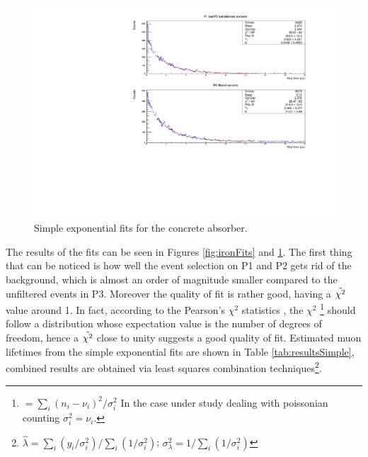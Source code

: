 \documentclass[../main.tex]{subfiles}
\begin{document}
\begin{figure}[htb!]
    \centering
    \includegraphics[width=0.9\linewidth]{images/concrete_filtered_fit.pdf}
    \caption{Simple exponential fits for the concrete absorber.}
    \label{fig:concreteFits}
\end{figure}

The results of the fits can be seen in Figures \ref{fig:ironFits} and \ref{fig:concreteFits}. The first thing that can be noticed is how well the event selection on P1 and P2 gets rid of the background, which is almost an order of magnitude smaller compared to the unfiltered events in P3. Moreover the quality of fit is rather good, having a $\Tilde{\chi^2}$ value around 1. In fact, according to the Pearson's $\chi^2$ statistics \cite{pearson1900x}, the $\chi^2$ \footnote{$=\sum_i (n_i - \nu_i)^2/\sigma_i^2$ In the case under study dealing with poissonian counting $\sigma_i^2=\nu_i.$} should follow a distribution whose expectation value is the number of degrees of freedom, hence a $\Tilde{\chi^2}$ close to unity suggests a good quality of fit. Estimated muon lifetimes from the  simple exponential fits are shown in Table \ref{tab:resultsSimple}, combined results are obtained via least squares combination techniques\footnote{$\hat{\lambda}=\sum_i(y_i/\sigma_i^2)/\sum_i(1/\sigma_i^2)$;\hspace{0.1cm} $\sigma^2_{\lambda}=1/\sum_i(1/\sigma_i^2)$}.
\end{document}
